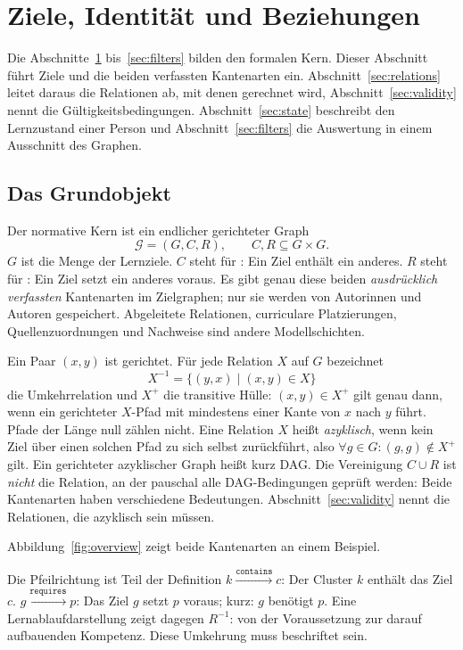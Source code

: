 \section{Ziele, Identität und Beziehungen}
\label{sec:core}
Die Abschnitte~\ref{sec:core} bis~\ref{sec:filters} bilden den formalen Kern.
Dieser Abschnitt führt Ziele und die beiden verfassten Kantenarten ein.
Abschnitt~\ref{sec:relations} leitet daraus die Relationen ab, mit denen
gerechnet wird, Abschnitt~\ref{sec:validity} nennt die
Gültigkeitsbedingungen. Abschnitt~\ref{sec:state} beschreibt den Lernzustand
einer Person und Abschnitt~\ref{sec:filters} die Auswertung in einem
Ausschnitt des Graphen.

\subsection{Das Grundobjekt}
Der normative Kern ist ein endlicher gerichteter Graph
\[
 \mathcal G=(G,C,R),\qquad C,R\subseteq G\times G.
\]
$G$ ist die Menge der Lernziele. $C$ steht für : Ein Ziel
enthält ein anderes. $R$ steht für : Ein Ziel setzt ein
anderes voraus. Es gibt genau diese beiden \emph{ausdrücklich verfassten}
Kantenarten im Zielgraphen; nur sie werden von Autorinnen und Autoren
gespeichert. Abgeleitete Relationen, curriculare Platzierungen,
Quellenzuordnungen und Nachweise sind andere Modellschichten.

Ein Paar $(x,y)$ ist gerichtet. Für jede Relation $X$ auf $G$ bezeichnet
\[
 X^{-1}=\{(y,x)\mid(x,y)\in X\}
\]
die Umkehrrelation und $X^+$ die transitive Hülle: $(x,y)\in X^+$ gilt genau
dann, wenn ein gerichteter $X$-Pfad mit mindestens einer Kante von $x$ nach
$y$ führt. Pfade der Länge null zählen nicht. Eine Relation $X$ heißt
\emph{azyklisch}, wenn kein Ziel über einen solchen Pfad zu sich selbst
zurückführt, also $\forall g\in G:(g,g)\notin X^+$ gilt. Ein gerichteter
azyklischer Graph heißt kurz DAG. Die Vereinigung $C\cup R$ ist
\emph{nicht} die Relation, an der pauschal alle DAG-Bedingungen geprüft
werden: Beide Kantenarten haben verschiedene Bedeutungen.
Abschnitt~\ref{sec:validity} nennt die Relationen, die azyklisch sein müssen.

Abbildung~\ref{fig:overview} zeigt beide Kantenarten an einem Beispiel.

\begin{principle}{Die Pfeilrichtung ist Teil der Definition}
$k\xrightarrow{\texttt{contains}}c$: Der Cluster $k$ enthält das Ziel $c$.
\quad
$g\xrightarrow{\texttt{requires}}p$: Das Ziel $g$ setzt $p$ voraus; kurz:
$g$ benötigt $p$.
Eine Lernablaufdarstellung zeigt dagegen $R^{-1}$: von der Voraussetzung
zur darauf aufbauenden Kompetenz. Diese Umkehrung muss beschriftet sein.
\end{principle}

